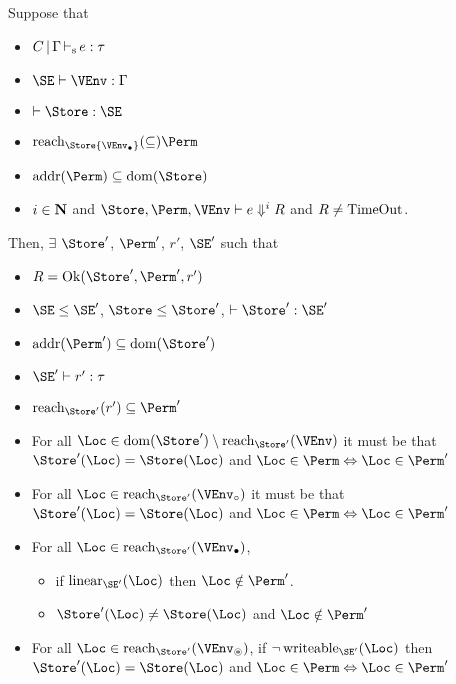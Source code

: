 \begin{theorem}
  Suppose that
  \begin{itemize}
  \item $C \operatorname{|} \Gamma \operatorname{\vdash_s} e : \tau$
  \item $\SE \vdash \VEnv : \E$
  \item $\vdash \Store : \SE$
  \item $\Reach\Store{\Active\VEnv} \subseteq \Perm$
  \item $\Addresses\Perm \subseteq \Dom\Store$
  \item  $i\in\mathbf{N}$ and $\Store, \Perm, \VEnv \vdash {e}
    \Downarrow^i R$ and $R\ne \operatorname{TimeOut}$.
  \end{itemize}
  Then,
  $\exists$ $\Store'$, $\Perm'$, $r'$, $\SE'$ such that
  \begin{itemize}
  \item
    $R = \Ok{\Store', \Perm', r'}$  
  \item $\SE \le \SE'$, $\Store \le \Store'$,
    $\vdash \Store' : \SE'$ 
  \item $\Addresses{\Perm'} \subseteq \Dom{\Store'}$
  \item $\SE' \vdash r' : \tau$
  \item $\Reach{\Store'}{r'} \subseteq \Perm'$
  \item For all $\Loc \in \Dom{\Store'} \setminus \Reach{\Store'}{\VEnv}$ it must be that
    $\Store' (\Loc) = \Store (\Loc)$
    and $\Loc\in\Perm \Leftrightarrow \Loc\in\Perm'$ 
  \item For all $\Loc \in \Reach{\Store'}{\ImmutableBorrows\VEnv}$ it must be that
    $\Store' (\Loc) = \Store (\Loc)$
    and $\Loc\in\Perm \Leftrightarrow \Loc\in\Perm'$ 
  \item For all $\Loc \in \Reach{\Store'}{\Active\VEnv}$,
    \begin{itemize}
    \item if $\Linear{\SE'}\Loc$ then $\Loc\notin\Perm'$.
    \item $\Store' (\Loc) \ne \Store (\Loc)$ and $\Loc\notin\Perm'$
    \end{itemize}
  \item For all $\Loc \in \Reach{\Store'}{\MutableBorrows\VEnv}$,
    if $\neg\Writeable{\SE'}\Loc $ then
    $\Store' (\Loc) = \Store (\Loc)$
    and $\Loc \in \Perm \Leftrightarrow \Loc\in\Perm'$ 
  \end{itemize}
\end{theorem}
    
